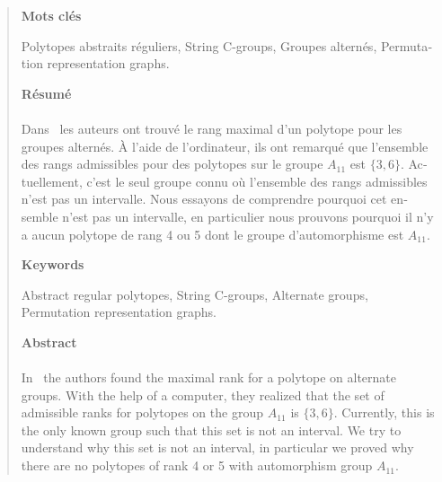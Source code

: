 \cleardoublepage{}

\thispagestyle{plain}

\hspace{3cm}

\begin{quote}

\vfill{}

\begin{otherlanguage}{french}

\begin{center}
  \textbf{Mots clés}
\end{center}

Polytopes abstraits réguliers, String C-groups, Groupes alternés, Permutation representation graphs.

\begin{center}
  \textbf{Résumé}
\end{center}


\paragraph{}
Dans~\cite{highestRankOfAn} les auteurs ont trouvé le rang maximal d'un polytope pour les groupes alternés. À l'aide de l'ordinateur, ils ont remarqué que l'ensemble des rangs admissibles pour des polytopes sur le groupe $A_{11}$ est $\{3,6\}$. Actuellement, c'est le seul groupe connu où l'ensemble des rangs admissibles n'est pas un intervalle. Nous essayons de comprendre pourquoi cet ensemble n'est pas un intervalle, en particulier nous prouvons pourquoi il n'y a aucun polytope de rang 4 ou 5 dont le groupe d'automorphisme est $A_{11}$.

\end{otherlanguage}

\vfill

\begin{center}
  \textbf{Keywords}
\end{center}

Abstract regular polytopes, String C-groups, Alternate groups, Permutation representation graphs.

\begin{center}
  \textbf{Abstract}
\end{center}

\paragraph{}
In~\cite{highestRankOfAn} the authors found the maximal rank for a polytope on alternate groups. With the help of a computer, they realized that the set of admissible ranks for polytopes on the group $A_{11}$ is $\{3,6\}$. Currently, this is the only known group such that this set is not an interval. We try to understand why this set is not an interval, in particular we proved why there are no polytopes of rank 4 or 5 with automorphism group $A_{11}$.

\vfill

\end{quote}
